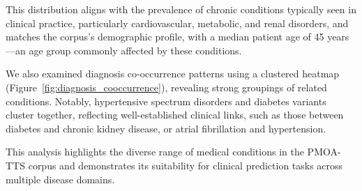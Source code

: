 This distribution aligns with the prevalence of chronic conditions typically seen in clinical practice, particularly cardiovascular, metabolic, and renal disorders, and matches the corpus’s demographic profile, with a median patient age of 45 years—an age group commonly affected by these conditions.

We also examined diagnosis co-occurrence patterns using a clustered heatmap (Figure~\ref{fig:diagnosis_cooccurrence}), revealing strong groupings of related conditions. Notably, hypertensive spectrum disorders and diabetes variants cluster together, reflecting well-established clinical links, such as those between diabetes and chronic kidney disease, or atrial fibrillation and hypertension.

This analysis highlights the diverse range of medical conditions in the PMOA-TTS corpus and demonstrates its suitability for clinical prediction tasks across multiple disease domains.


